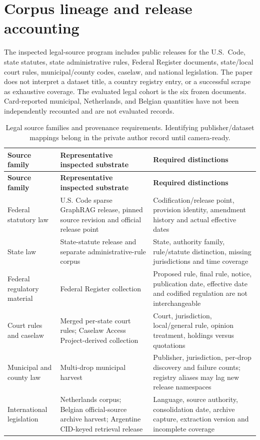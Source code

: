 \documentclass{article}
\begin{document}
\section{Corpus lineage and release accounting}

The inspected legal-source program includes public releases for the U.S.\ Code, state statutes, state administrative rules, Federal Register documents, state/local court rules, municipal/county codes, caselaw, and national legislation. The paper does not interpret a dataset title, a country registry entry, or a successful scrape as exhaustive coverage. The evaluated legal cohort is the six frozen documents. Card-reported municipal, Netherlands, and Belgian quantities have not been independently recounted and are not evaluated records.
\begingroup
\renewcommand{\thetable}{A1}
\begin{longtable}{@{}>{\raggedright\arraybackslash}p{.24\linewidth} >{\raggedright\arraybackslash}p{.32\linewidth} >{\raggedright\arraybackslash}p{.38\linewidth}@{}}
\caption{Legal source families and provenance requirements. Identifying publisher/dataset mappings belong in the private author record until camera-ready.}\label{tab:A1}\\
\toprule
\textbf{Source family} & \textbf{Representative inspected substrate} & \textbf{Required distinctions} \\
\midrule
\endfirsthead
\textbf{Source family} & \textbf{Representative inspected substrate} & \textbf{Required distinctions} \\
\midrule
\endhead
\bottomrule
\endlastfoot
Federal statutory law & U.S. Code sparse GraphRAG release, pinned source revision and official release point & Codification/release point, provision identity, amendment history and actual effective dates \\[3pt]
State law & State-statute release and separate administrative-rule corpus & State, authority family, rule/statute distinction, missing jurisdictions and time coverage \\[3pt]
Federal regulatory material & Federal Register collection & Proposed rule, final rule, notice, publication date, effective date and codified regulation are not interchangeable \\[3pt]
Court rules and caselaw & Merged per-state court rules; Caselaw Access Project-derived collection & Court, jurisdiction, local/general rule, opinion treatment, holdings versus quotations \\[3pt]
Municipal and county law & Multi-drop municipal harvest & Publisher, jurisdiction, per-drop discovery and failure counts; registry aliases may lag new release namespaces \\[3pt]
International legislation & Netherlands corpus; Belgian official-source archive harvest; Argentine CID-keyed retrieval release & Language, source authority, consolidation date, archive capture, extraction version and incomplete coverage \\[3pt]
\end{longtable}
\endgroup
\end{document}
